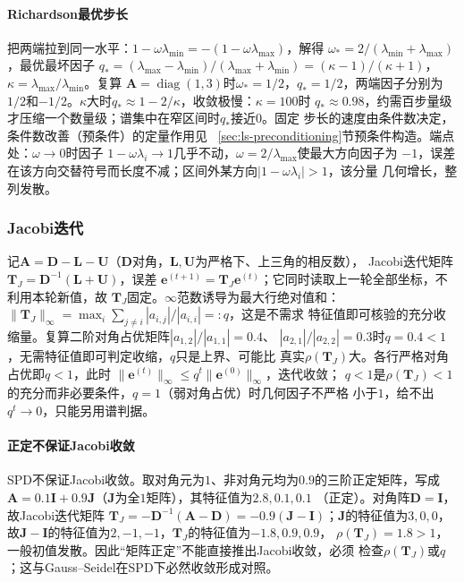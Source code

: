 \paragraph{Richardson最优步长}

把两端拉到同一水平：$1-\omega\lambda_{\min}=-(1-\omega\lambda_{\max})$，解得
$\omega_*=2/(\lambda_{\min}+\lambda_{\max})$，最优最坏因子
$q_*=(\lambda_{\max}-\lambda_{\min})/(\lambda_{\max}+\lambda_{\min})
=(\kappa-1)/(\kappa+1)$，$\kappa=\lambda_{\max}/\lambda_{\min}$。复算
$\bm A=\operatorname{diag}(1,3)$时$\omega_*=1/2$，$q_*=1/2$，两端因子分别为
$1/2$和$-1/2$。$\kappa$大时$q_*\approx1-2/\kappa$，收敛极慢：$\kappa=100$时
$q_*\approx0.98$，约需百步量级才压缩一个数量级；谱集中在窄区间时$q_*$接近$0$。固定
步长的速度由条件数决定，条件数改善（预条件）的定量作用见
~\ref{sec:ls-preconditioning}节预条件构造。端点处：$\omega\to0$时因子
$1-\omega\lambda_i\to1$几乎不动，$\omega=2/\lambda_{\max}$使最大方向因子为
$-1$，误差在该方向交替符号而长度不减；区间外某方向$|1-\omega\lambda_i|>1$，该分量
几何增长，整列发散。

\subsubsection{Jacobi迭代}

记$\bm A=\bm D-\bm L-\bm U$（$\bm D$对角，$\bm L,\bm U$为严格下、上三角的相反数），
Jacobi迭代矩阵$\bm T_J=\bm D^{-1}(\bm L+\bm U)$，误差
$\bm e^{(t+1)}=\bm T_J\bm e^{(t)}$；它同时读取上一轮全部坐标，不利用本轮新值，故
$\bm T_J$固定。$\infty$范数诱导为最大行绝对值和：
$\lVert\bm T_J\rVert_\infty=\max_i\sum_{j\neq i}|a_{i,j}|/|a_{i,i}|=:q$，这是不需求
特征值即可核验的充分收缩量。复算二阶对角占优矩阵$|a_{1,2}|/|a_{1,1}|=0.4$、
$|a_{2,1}|/|a_{2,2}|=0.3$时$q=0.4<1$，无需特征值即可判定收缩，$q$只是上界、可能比
真实$\rho(\bm T_J)$大。各行严格对角占优即$q<1$，此时
$\lVert\bm e^{(t)}\rVert_\infty\leq q^t\lVert\bm e^{(0)}\rVert_\infty$，迭代收敛；
$q<1$是$\rho(\bm T_J)<1$的充分而非必要条件，$q=1$（弱对角占优）时几何因子不严格
小于$1$，给不出$q^t\to0$，只能另用谱判据。

\paragraph{正定不保证Jacobi收敛}

SPD不保证Jacobi收敛。取对角元为$1$、非对角元均为$0.9$的三阶正定矩阵，写成
$\bm A=0.1\bm I+0.9\bm J$（$\bm J$为全$1$矩阵），其特征值为$2.8,0.1,0.1$
（正定）。对角阵$\bm D=\bm I$，故Jacobi迭代矩阵
$\bm T_J=-\bm D^{-1}(\bm A-\bm D)=-0.9(\bm J-\bm I)$；$\bm J$的特征值为$3,0,0$，
故$\bm J-\bm I$的特征值为$2,-1,-1$，$\bm T_J$的特征值为$-1.8,0.9,0.9$，
$\rho(\bm T_J)=1.8>1$，一般初值发散。因此“矩阵正定”不能直接推出Jacobi收敛，必须
检查$\rho(\bm T_J)$或$q$；这与Gauss--Seidel在SPD下必然收敛形成对照。

